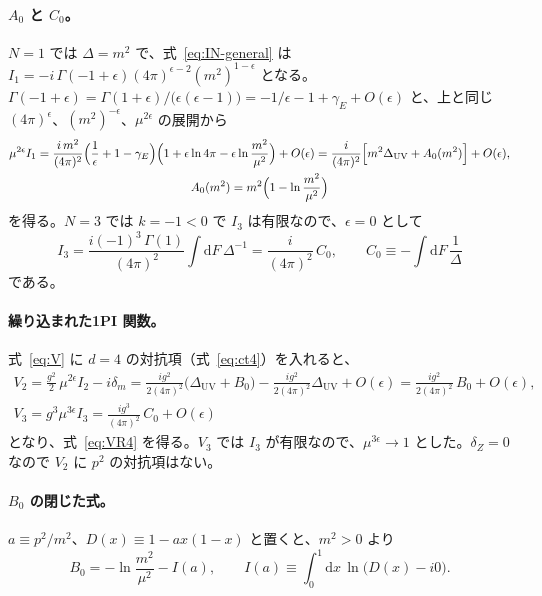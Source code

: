 \documentclass[a4paper,10pt]{ltjsarticle}
\newcommand{\dd}{\mathrm{d}}
\begin{document}
\paragraph{$A_0$ と $C_0$。}$N=1$ では $\Delta=m^2$ で、式~\eqref{eq:IN-general} は $I_1=-i\,\Gamma(-1+\epsilon)(4\pi)^{\epsilon-2}(m^2)^{1-\epsilon}$ となる。$\Gamma(-1+\epsilon)=\Gamma(1+\epsilon)/\bigl(\epsilon(\epsilon-1)\bigr)=-1/\epsilon-1+\gamma_E+O(\epsilon)$ と、上と同じ $(4\pi)^\epsilon$、$(m^2)^{-\epsilon}$、$\mu^{2\epsilon}$ の展開から
\begin{gather*}
\mu^{2\epsilon}I_1=\frac{i\,m^2}{(4\pi)^2}\Bigl(\frac1\epsilon+1-\gamma_E\Bigr)\Bigl(1+\epsilon\ln4\pi-\epsilon\ln\frac{m^2}{\mu^2}\Bigr)+O(\epsilon)
=\frac{i}{(4\pi)^2}\Bigl[m^2\Delta_{\mathrm{UV}}+A_0(m^2)\Bigr]+O(\epsilon),\\
A_0(m^2)=m^2\Bigl(1-\ln\frac{m^2}{\mu^2}\Bigr)
\end{gather*}
を得る。$N=3$ では $k=-1<0$ で $I_3$ は有限なので、$\epsilon=0$ として
\begin{equation*}
I_3=\frac{i(-1)^3\,\Gamma(1)}{(4\pi)^2}\int\!\dd F\,\Delta^{-1}=\frac{i}{(4\pi)^2}\,C_0,\qquad C_0\equiv-\int\!\dd F\,\frac1\Delta
\end{equation*}
である。

\paragraph{繰り込まれた1PI 関数。}式~\eqref{eq:V} に $d=4$ の対抗項（式~\eqref{eq:ct4}）を入れると、
\begin{gather*}
V_2=\frac{g^2}{2}\,\mu^{2\epsilon}I_2-i\delta_m=\frac{ig^2}{2(4\pi)^2}\bigl(\Delta_{\mathrm{UV}}+B_0\bigr)-\frac{ig^2}{2(4\pi)^2}\Delta_{\mathrm{UV}}+O(\epsilon)=\frac{ig^2}{2(4\pi)^2}\,B_0+O(\epsilon),\\
V_3=g^3\mu^{3\epsilon}I_3=\frac{ig^3}{(4\pi)^2}\,C_0+O(\epsilon)
\end{gather*}
となり、式~\eqref{eq:VR4} を得る。$V_3$ では $I_3$ が有限なので、$\mu^{3\epsilon}\to1$ とした。$\delta_Z=0$ なので $V_2$ に $p^2$ の対抗項はない。

\paragraph{$B_0$ の閉じた式。}$a\equiv p^2/m^2$、$D(x)\equiv1-ax(1-x)$ と置くと、$m^2>0$ より
\begin{equation*}
B_0=-\ln\frac{m^2}{\mu^2}-I(a),\qquad I(a)\equiv\int_0^1\dd x\,\ln\bigl(D(x)-i0\bigr).
\end{equation*}
\end{document}
